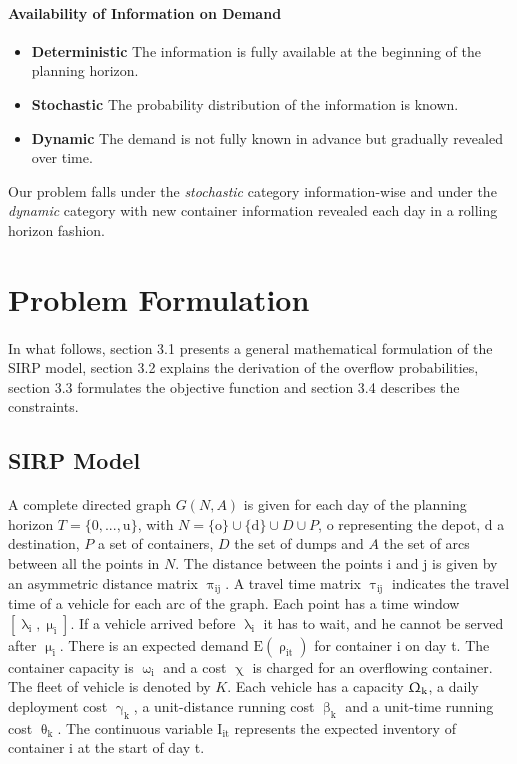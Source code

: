 \documentclass[12pt,a4paper]{article}
\begin{document}
\paragraph{Availability of Information on Demand}
\begin{itemize}
\item \textbf{Deterministic} The information is fully available at the beginning of the planning horizon.
\item \textbf{Stochastic} The probability distribution of the information is known.
\item \textbf{Dynamic} The demand is not fully known in advance but gradually revealed over time.
\end{itemize}
Our problem falls under the \textit{stochastic} category information-wise and under the \textit{dynamic} category with new container information revealed each day in a rolling horizon fashion.

\section{Problem Formulation}
\paragraph{}
In what follows, section 3.1 presents a general mathematical formulation of the SIRP model, section 3.2 explains the derivation of the overflow probabilities, section 3.3 formulates the objective function and section 3.4 describes the constraints.

\subsection{SIRP Model}
\paragraph{}
A complete directed graph $G(N,A)$ is given for each day of the planning horizon $T = \{0,...,\text{u}\}$, with $N = \{\text{o}\} \cup \{\text{d}\} \cup D \cup P$, o representing the depot, d a destination, $P$ a set of containers, $D$ the set of dumps and $A$ the set of arcs between all the points in $N$. The distance between the points i and j is given by an asymmetric distance matrix $\uppi_{\text{ij}}$. A travel time matrix $\uptau_{\text{ij}}$ indicates the travel time of a vehicle for each arc of the graph. Each point has a time window $[\uplambda_{\text{i}}, \upmu_{\text{i}}]$. If a vehicle arrived before $\uplambda_{\text{i}}$ it has to wait, and he cannot be served after $\upmu_{\text{i}}$. There is an expected demand $\text{E}(\uprho_{\text{it}})$ for container i on day t. The container capacity is $\upomega_{\text{i}}$ and a cost $\upchi$ is charged for an overflowing container. The fleet of vehicle is denoted by $K$. Each vehicle has a capacity $\Upomega_{\text{k}}$, a daily deployment cost $\upgamma_{\text{k}}$, a unit-distance running cost $\upbeta_{\text{k}}$ and a unit-time running cost $\uptheta_{\text{k}}$. The continuous variable $\text{I}_{\text{it}}$ represents the expected inventory of container i at the start of day t. 
\end{document}

